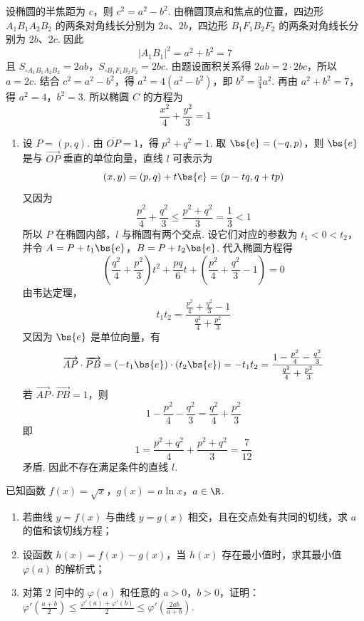 \begin{solution}
设椭圆的半焦距为 \(c\)，则 \(c^2=a^2-b^2\). 由椭圆顶点和焦点的位置，四边形 \(A_1B_1A_2B_2\) 的两条对角线长分别为 \(2a\)、\(2b\)，四边形 \(B_1F_1B_2F_2\) 的两条对角线长分别为 \(2b\)、\(2c\). 因此
\[
|A_1B_1|^2=a^2+b^2=7
\]
且 \(S_{\square A_1B_1A_2B_2}=2ab\)，\(S_{\square B_1F_1B_2F_2}=2bc\).
由题设面积关系得 \(2ab=2\cdot2bc\)，所以 \(a=2c\). 结合 \(c^2=a^2-b^2\)，得 \(a^2=4(a^2-b^2)\)，即 \(b^2=\frac{3}{4}a^2\). 再由 \(a^2+b^2=7\)，得 \(a^2=4\)，\(b^2=3\).
所以椭圆 \(C\) 的方程为
\[
\frac{x^2}{4}+\frac{y^2}{3}=1
\]

\begin{enumerate}
\item 设 \(P=(p,q)\). 由 \(\overline{OP}=1\)，得 \(p^2+q^2=1\). 取 \(\bs{e}=(-q,p)\)，则 \(\bs{e}\) 是与 \(\overrightarrow{OP}\) 垂直的单位向量，直线 \(l\) 可表示为
\[
(x,y)=(p,q)+t\bs{e}=(p-tq,q+tp)
\]
又因为
\[
\frac{p^2}{4}+\frac{q^2}{3}\leqslant\frac{p^2+q^2}{3}=\frac13<1
\]
所以 \(P\) 在椭圆内部，\(l\) 与椭圆有两个交点. 设它们对应的参数为 \(t_1<0<t_2\)，并令 \(A=P+t_1\bs{e}\)，\(B=P+t_2\bs{e}\). 代入椭圆方程得
\[
\left(\frac{q^2}{4}+\frac{p^2}{3}\right)t^2+\frac{pq}{6}t+\left(\frac{p^2}{4}+\frac{q^2}{3}-1\right)=0
\]
由韦达定理，
\[
t_1t_2=\frac{\frac{p^2}{4}+\frac{q^2}{3}-1}{\frac{q^2}{4}+\frac{p^2}{3}}
\]
又因为 \(\bs{e}\) 是单位向量，有
\[
\overrightarrow{AP}\cdot\overrightarrow{PB}=(-t_1\bs{e})\cdot(t_2\bs{e})=-t_1t_2=\frac{1-\frac{p^2}{4}-\frac{q^2}{3}}{\frac{q^2}{4}+\frac{p^2}{3}}
\]
若 \(\overrightarrow{AP}\cdot\overrightarrow{PB}=1\)，则
\[
1-\frac{p^2}{4}-\frac{q^2}{3}=\frac{q^2}{4}+\frac{p^2}{3}
\]
即
\[
1=\frac{p^2+q^2}{4}+\frac{p^2+q^2}{3}=\frac7{12}
\]
矛盾. 因此不存在满足条件的直线 \(l\).
\end{enumerate}
\end{solution}

\begin{problem}
已知函数 \(f(x) = \sqrt{x}\)，\(g(x) = a\ln x\)，\(a \in \R\).

\begin{enumerate}
\item 若曲线 \(y = f(x)\) 与曲线 \(y = g(x)\) 相交，且在交点处有共同的切线，求 \(a\) 的值和该切线方程；
\item 设函数 \(h(x) = f(x) - g(x)\)，当 \(h(x)\) 存在最小值时，求其最小值 \(\varphi(a)\) 的解析式；
\item 对第 \(2\) 问中的 \(\varphi(a)\) 和任意的 \(a > 0\)，\(b > 0\)，证明：\(\varphi'\left(\frac{a + b}{2}\right) \leqslant \frac{\varphi'(a) + \varphi'(b)}{2} \leqslant \varphi'\left(\frac{2ab}{a + b}\right)\).
\end{enumerate}
\end{problem}

